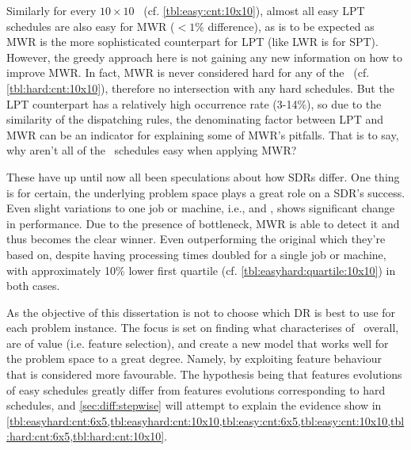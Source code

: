 Similarly for every $10\times10$ \JSP\ (cf. \cref{tbl:easy:cnt:10x10}), almost all easy LPT schedules are also easy  for MWR ($<1\%$ difference), as is to be expected as MWR is the more sophisticated counterpart for LPT (like LWR is for SPT). 
However, the greedy approach here is  not gaining any new information on how to improve MWR. 
In fact, MWR is never considered hard for any of the \JSP\ (cf. \cref{tbl:hard:cnt:10x10}), therefore no intersection with any hard schedules. 
But the LPT counterpart has a relatively high occurrence rate (3-14\%), so due to the similarity of the dispatching rules, the denominating factor between LPT and MWR can be an indicator for explaining some of MWR's pitfalls.
That is to say, why aren't all of the \jsp\ schedules easy when applying MWR? 

These have up until now all been speculations about how SDRs differ. One thing 
is for certain, the underlying problem space plays a great role on a SDR's 
success. Even slight variations to one job or machine, i.e.,  and 
, shows significant change in performance. Due to the presence of 
bottleneck, MWR is able to detect it and thus becomes the clear winner. Even 
outperforming the original  which they're based on, despite having 
processing times doubled for a single job or machine, with approximately 10\% 
lower first quartile (cf. \cref{tbl:easyhard:quartile:10x10}) in both cases. 

As the objective of this dissertation is not to choose which DR is best to use for each problem instance. 
The focus is set on finding what characterises of \jsp\ overall, are of value (i.e. feature selection), and create a new model that works well for the problem space to a great degree.
Namely, by exploiting feature behaviour that is considered more favourable. The hypothesis being that features evolutions of easy schedules greatly differ from features evolutions corresponding to hard schedules, and \cref{sec:diff:stepwise} will attempt to explain the evidence show in \cref{tbl:easyhard:cnt:6x5,tbl:easyhard:cnt:10x10,tbl:easy:cnt:6x5,tbl:easy:cnt:10x10,tbl:hard:cnt:6x5,tbl:hard:cnt:10x10}.

